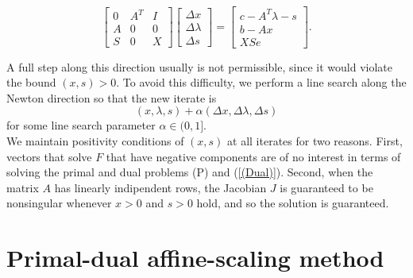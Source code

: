 \documentclass[a4paper,10 pt,titlepage,twoside]{book}
\theoremstyle{plain}
\theoremstyle{definition}
\theoremstyle{remark}
\begin{document}
\begin{equation}\label{(5.1)}
	\begin{bmatrix}
0&A^{T}&I \\A&0&0\\S&0&X
	\end{bmatrix}\begin{bmatrix}
	\Delta x\\\Delta\lambda \\\Delta s
	\end{bmatrix}=\begin{bmatrix}
	c-A^{T}\lambda-s\\b-Ax\\XSe
	\end{bmatrix}.
\end{equation}

A full step along this direction usually is not permissible, since it would violate the bound $(x,s)>0$. To avoid this difficulty, we perform a line search along the Newton direction so that the new iterate is
\begin{equation*}
	(x,\lambda,s) +\alpha (\Delta x,\Delta \lambda,\Delta s)
\end{equation*} 
for some line search parameter $\alpha \in (0,1]$. \\We maintain positivity conditions of $(x,s)$ at all iterates for two reasons. First, vectors that solve $\mathit{F}$ that have negative components are of no interest in terms of solving the primal and dual problems (P) and (\ref{(Dual)}). Second, when the matrix $A$ has linearly indipendent rows, the Jacobian $J$ is guaranteed to be nonsingular whenever $x>0$ and $s>0$ hold, and so the solution is guaranteed.

\section{Primal-dual affine-scaling method}
\end{document}
